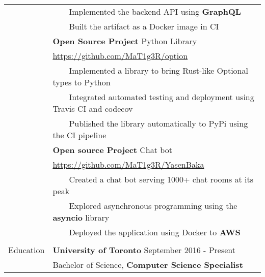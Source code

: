 \documentclass[letterpaper,12pt,oneside]{article}
\newcommand{\tabitem}{~~\llap{\textbullet}~~}
\newcommand{\smallurl}[1]{\scriptsize{\url{#1}}}
\begin{document}
\begin{longtable}{@{} l p{14cm}}
& \tabitem Implemented the backend API using \textbf{GraphQL} \\
& \tabitem Built the artifact as a Docker image in CI \\
& \textbf{Open Source Project} Python Library \\
& \smallurl{https://github.com/MaT1g3R/option} \\
& \tabitem Implemented a library to bring Rust-like Optional types to Python \\
& \tabitem Integrated automated testing and deployment using Travis CI and codecov \\
& \tabitem Published the library automatically to PyPi using the CI pipeline \\
& \textbf{Open source Project} Chat bot \\
& \smallurl{https://github.com/MaT1g3R/YasenBaka} \\
& \tabitem Created a chat bot serving 1000+ chat rooms at its peak \\
& \tabitem Explored asynchronous programming using the \textbf{asyncio} library \\
& \tabitem Deployed the application using Docker to \textbf{AWS} \\
& \\
\Large{Education} & \large{\textbf{University of Toronto}} September 2016 - Present\\
                  & Bachelor of Science, \textbf{Computer Science Specialist} \\
\end{longtable}
\end{document}

